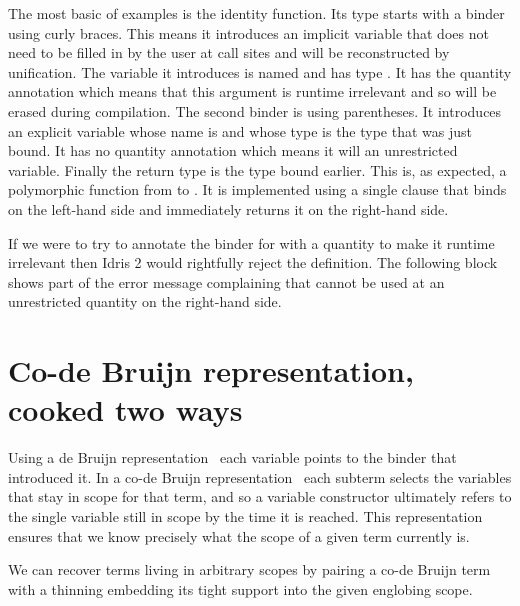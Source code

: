 \documentclass{article}
\newcommand{\idris}{Idris 2}
\begin{document}
The most basic of examples is the identity function.
%
Its type starts with a binder using curly braces. This means it introduces an implicit
variable that does not need to be filled in by the user at call sites and will be
reconstructed by unification. The variable it introduces is named  and
has type . It has the  quantity annotation which means
that this argument is runtime irrelevant and so will be erased during compilation.
%
The second binder is using parentheses. It introduces an explicit variable whose name
is  and whose type is the type  that was just bound. It has
no quantity annotation which means it will an unrestricted variable.
%
Finally the return type is the type  bound earlier. This is, as expected,
a polymorphic function from  to . It is implemented using
a single clause that binds  on the left-hand side and immediately returns
it on the right-hand side.


If we were to try to annotate the binder for  with a 
quantity to make it runtime irrelevant then \idris{} would
rightfully reject the definition.
%
The following  block shows part of the error message complaining
that  cannot be used at an unrestricted quantity on the right-hand side.



\section{Co-de Bruijn representation, cooked two ways}

Using a de Bruijn representation~\cite{MANUAL:journals/math/debruijn72} each variable
points to the binder that introduced it. In a co-de Bruijn
representation~\cite{DBLP:journals/corr/abs-1807-04085} each subterm
selects the variables that stay in scope for that term, and so a variable constructor
ultimately refers to the single variable still in scope by the time it is reached.
%
This representation ensures that we know precisely what the scope of a given term
currently is.

We can recover terms living in arbitrary scopes by pairing a co-de Bruijn term
with a thinning embedding its tight support into the given englobing scope.
\end{document}
